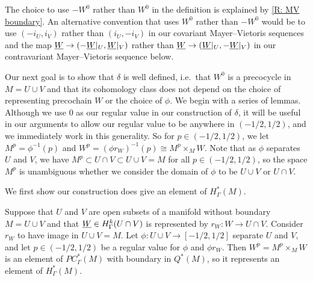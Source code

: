 The choice to use $-W^0$ rather than $W^0$ in the definition is explained by \cref{R: MV boundary}.
An alternative convention that uses $W^0$ rather than $-W^0$ would be to use $(-i_U,i_V)$ rather than $(i_U,-i_V)$ in our covariant Mayer--Vietoris sequences and the map $\underline{W} \to (-\underline{W}|_U, \underline{W}|_V)$ rather than $\underline{W} \to (\underline{W}|_U, -\underline{W}|_V)$ in our contravariant Mayer--Vietoris sequence below.

Our next goal is to show that $\delta$ is well defined, i.e.\ that $W^0$ is a precocycle in $M = U \cup V$ and that its cohomology class does not depend on the choice of representing precochain $W$ or the choice of $\phi$.
We begin with a series of lemmas.
Although we use $0$ as our regular value in our construction of $\delta$, it will be useful in our arguments to allow our regular value to be anywhere in $(-1/2,1/2)$, and we immediately work in this generality.
So for $p \in (-1/2,1/2)$, we let $M^p = \phi^{-1}(p)$ and $W^p = (\phi r_W)^{-1}(p) \cong M^p \times_{M} W$.
Note that as $\phi$ separates $U$ and $V$, we have $M^p \subset U \cap V \subset U \cup V = M$ for all $p \in (-1/2,1/2)$, so the space $M^p$ is unambiguous whether we consider the domain of $\phi$ to be $U \cup V$ or $U \cap V$.

We first show our construction does give an element of $H^*_\Gamma(M)$.

\begin{lemma}
	Suppose that $U$ and $V$ are open subsets of a manifold without boundary $M = U \cup V$ and that $\underline{W} \in H^k_\Gamma(U \cap V)$ is represented by $r_W \colon W \to U \cap V$.
	Consider $r_W$ to have image in $U \cup V = M$.
	Let $\phi \colon U \cup V \to [-1/2,1/2]$ separate $U$ and $V$, and let $p \in (-1/2, 1/2)$ be a regular value for $\phi$ and $\phi r_W$.
	Then $W^p = M^p \times_{M} W$ is an element of $PC^*_\Gamma(M)$ with boundary in $Q^*(M)$, so it represents an element of $H^*_\Gamma(M)$.
\end{lemma}

